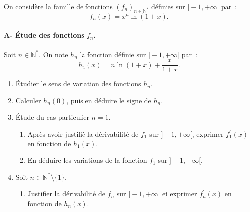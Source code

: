 



\begin{exercice}



On consid\`ere la famille de fonctions $(f_n)_{n\in\mathbb{N}^*}$ d\'efinies
sur $]-1,+\infty[$ par~: 
\begin{equation*}
f_n(x)=x^n\ln (1+x).
\end{equation*}


\paragraph{A- \'Etude des fonctions $f_n$.\\}




Soit $n\in \mathbb{N}^*$. On note $h_n$ la fonction d\'efinie sur $%
]-1,+\infty[$ par~: 
\begin{equation*}
h_n(x)=n\ln(1+x)+\frac{x}{1+x}.
\end{equation*}

\begin{enumerate}
\item \'{E}tudier le sens de variation des fonctions $h_{n}$.

\item Calculer $h_{n}(0)$, puis en d\'{e}duire le signe de $h_{n}$.

\item \'{E}tude du cas particulier $n=1$.

\begin{enumerate}
\item Apr\`{e}s avoir justifi\'{e} la d\'{e}rivabilit\'{e} de $f_{1}$ sur $%
]-1,+\infty [$, exprimer $f_{1}^{\prime }(x)$ en fonction de $h_{1}(x)$.

\item En d\'{e}duire les variations de la fonction $f_{1}$ sur $]-1,+\infty
[ $.
\end{enumerate}

\item Soit $n\in \mathbb{N}^{*}\setminus \{1\}$.

\begin{enumerate}
\item Justifier la d\'{e}rivabilit\'{e} de $f_{n}$ sur $]-1,+\infty [$ et
exprimer $f_{n}^{\prime }(x)$ en fonction de $h_{n}(x)$.


\end{enumerate}
\end{enumerate}
\end{exercice}

